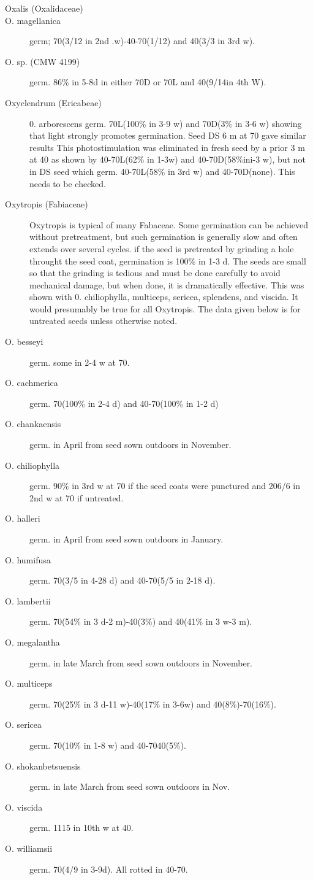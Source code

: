 \begin{description}
\item[Oxalis (Oxalidaceae)]
\item[O. magellanica] germ; 70(3/12 in 2nd .w)-40-70(1/12) and 40(3/3 in 3rd w).
\item[O. sp. (CMW 4199)] germ. 86\% in 5-8d in either 70D or 70L and 40(9/14in 4th
W).

\item[Oxyclendrum (Ericabeae)] 0. arborescens germ. 70L(100\% in 3-9 w) and
70D(3\% in 3-6 w) showing that light strongly promotes germination. Seed DS 6 m at
70 gave similar results This photostimulation was eliminated in fresh seed by a prior 3
m at 40 as shown by 40-70L(62\% in 1-3w) and 40-70D(58\%ini-3 w), but not in DS
seed which germ. 40-70L(58\% in 3rd w) and 40-70D(none). This needs to be
checked.

\item[Oxytropis (Fabiaceae)] Oxytropis is typical of many Fabaceae. Some
germination can be achieved without pretreatment, but such germination is generally
slow and often extends over several cycles. if the seed is pretreated by grinding a
hole throught the seed coat, germination is 100\% in 1-3 d. The seeds are small so that
the grinding is tedious and must be done carefully to avoid mechanical damage, but
when done, it is dramatically effective. This was shown with 0. chiliophylla, multiceps,
sericea, splendens, and viscida. It would presumably be true for all Oxytropis. The
data given below is for untreated seeds unless otherwise noted.
\item[O. besseyi] germ. some in 2-4 w at 70.
\item[O. cachmerica] germ. 70(100\% in 2-4 d) and 40-70(100\% in 1-2 d)
\item[O. chankaensis] germ. in April from seed sown outdoors in November.
\item[O. chiliophylla] germ. 90\% in 3rd w at 70 if the seed coats were punctured and 206/6 in 2nd w at 70 if untreated.
\item[O. halleri] germ. in April from seed sown outdoors in January.
\item[O. humifusa] germ. 70(3/5 in 4-28 d) and 40-70(5/5 in 2-18 d).
\item[O. lambertii] germ. 70(54\% in 3 d-2 m)-40(3\%) and 40(41\% in 3 w-3 m).
\item[O. megalantha] germ. in late March from seed sown outdoors in November.
\item[O. multiceps] germ. 70(25\% in 3 d-11 w)-40(17\% in 3-6w) and 40(8\%)-70(16\%).
\item[O. sericea] germ. 70(10\% in 1-8 w) and 40-7040(5\%).
\item[O. shokanbetsuensis] germ. in late March from seed sown outdoors in Nov.
\item[O. viscida] germ. 1115 in 10th w at 40.
\item[O. williamsii] germ. 70(4/9 in 3-9d). All rotted in 40-70.

\end{description}
